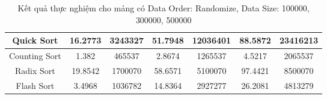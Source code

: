 \begin{table}[H]
{\begin{tabular}{|ccccccc|}
\multicolumn{1}{|c|}{Quick Sort} & \multicolumn{1}{c|}{16.2773} & \multicolumn{1}{c|}{3243327} & \multicolumn{1}{c|}{51.7948} & \multicolumn{1}{c|}{12036401} & \multicolumn{1}{c|}{88.5872} & \multicolumn{1}{c|}{23416213} \\ \hline
\multicolumn{1}{|c|}{Counting Sort} & \multicolumn{1}{c|}{1.382} & \multicolumn{1}{c|}{465537} & \multicolumn{1}{c|}{2.8674} & \multicolumn{1}{c|}{1265537} & \multicolumn{1}{c|}{4.5217} & \multicolumn{1}{c|}{2065537} \\ \hline
\multicolumn{1}{|c|}{Radix Sort} & \multicolumn{1}{c|}{19.8542} & \multicolumn{1}{c|}{1700070} & \multicolumn{1}{c|}{58.6571} & \multicolumn{1}{c|}{5100070} & \multicolumn{1}{c|}{97.4421} & \multicolumn{1}{c|}{8500070} \\ \hline
\multicolumn{1}{|c|}{Flash Sort} & \multicolumn{1}{c|}{3.4968} & \multicolumn{1}{c|}{1036782} & \multicolumn{1}{c|}{14.8364} & \multicolumn{1}{c|}{2927277} & \multicolumn{1}{c|}{26.2081} & \multicolumn{1}{c|}{4813279} \\ \hline
\end{tabular}%
}
\caption{Kết quả thực nghiệm cho mảng có Data Order: Randomize, Data Size: 100000, 300000, 500000}
\label{tab:randomize_100000_300000_500000}
\end{table}

